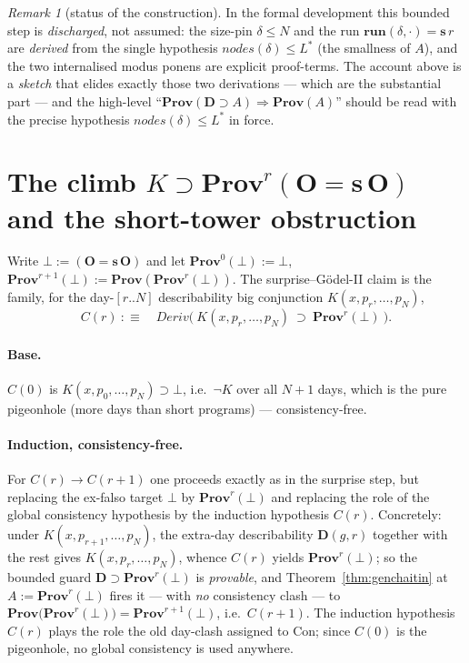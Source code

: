 \documentclass[11pt]{article}
\theoremstyle{plain}
\theoremstyle{definition}
\theoremstyle{remark}
\newtheorem{remark}[theorem]{Remark}
\newcommand{\runp}{\mathbf{run}}
\newcommand{\Prov}{\mathbf{Prov}}
\newcommand{\Deriv}{\mathit{Deriv}}
\newcommand{\Lstar}{L^{*}}
\newcommand{\describe}{\mathbf{D}}
\begin{document}
\begin{remark}[status of the construction]
In the formal development this bounded step is \emph{discharged}, not assumed: the
size-pin $\delta\le\mathit{N}$ and the run $\runp(\delta,\cdot)=\mathbf{s}\,r$ are
\emph{derived} from the single hypothesis $\mathit{nodes}(\delta)\le\Lstar$ (the
smallness of $A$), and the two internalised modus ponens are explicit
proof-terms. The account above is a \emph{sketch} that elides exactly those two
derivations --- which are the substantial part --- and the high-level
``$\Prov(\describe\supset A)\Rightarrow\Prov(A)$'' should be read with the
precise hypothesis $\mathit{nodes}(\delta)\le\Lstar$ in force.
\end{remark}

\section{The climb $K\supset\Prov^r(\mathbf{O}{=}\mathbf{s}\,\mathbf{O})$ and the short-tower obstruction}

Write $\bot:=(\mathbf{O}=\mathbf{s}\,\mathbf{O})$ and let
$\Prov^0(\bot):=\bot$, $\Prov^{r+1}(\bot):=\Prov(\Prov^r(\bot))$. The
surprise--G\"odel-II claim is the family, for the day-$[r..N]$ describability
big conjunction $K(x,p_r,\dots,p_N)$,
\[
  C(r)\ :\equiv\quad \Deriv\bigl(\ K(x,p_r,\dots,p_N)\ \supset\ \Prov^r(\bot)\ \bigr).
\]

\paragraph{Base.} $C(0)$ is $K(x,p_0,\dots,p_N)\supset\bot$, i.e.\ $\neg K$ over
all $N{+}1$ days, which is the pure pigeonhole (more days than short programs) ---
consistency-free.

\paragraph{Induction, consistency-free.} For $C(r)\to C(r+1)$ one proceeds
exactly as in the surprise step, but replacing the ex-falso target $\bot$ by
$\Prov^r(\bot)$ and replacing the role of the global consistency hypothesis by
the induction hypothesis $C(r)$. Concretely: under $K(x,p_{r+1},\dots,p_N)$, the
extra-day describability $\describe(g,r)$ together with the rest gives
$K(x,p_r,\dots,p_N)$, whence $C(r)$ yields $\Prov^r(\bot)$; so the bounded guard
$\describe\supset\Prov^r(\bot)$ is \emph{provable}, and Theorem~\ref{thm:genchaitin}
at $A:=\Prov^r(\bot)$ fires it --- with \emph{no} consistency clash --- to
$\Prov\bigl(\Prov^r(\bot)\bigr)=\Prov^{r+1}(\bot)$, i.e.\ $C(r+1)$. The induction
hypothesis $C(r)$ plays the role the old day-clash assigned to $\mathrm{Con}$;
since $C(0)$ is the pigeonhole, no global consistency is used anywhere.
\end{document}
